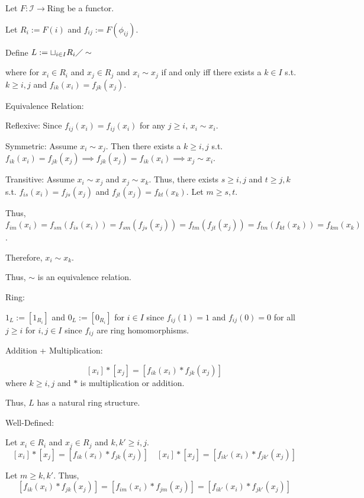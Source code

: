 \documentclass[12pt, letterpaper]{article}
\begin{document}
\qh
\begin{subproblem}{}
    
\end{subproblem}
\begin{problemproof}
    Let $F : \mathcal{I} \to \mathrm{Ring}$ be a functor.

    Let $R_i := F(i)$ and $f_{ij} := F(\phi_{ij})$.
    
    Define $L := \sqcup_{i \in I} R_i \diagup \sim$

    where for $x_i \in R_i$ and $x_j \in R_j$ and $x_i \sim x_j$ if and only iff there exists a $k \in I$ s.t. $k \geq i,j$ and $f_{ik}(x_i)=f_{jk}(x_j)$.

    Equivalence Relation:

    Reflexive: Since $f_{ij}(x_i)=f_{ij}(x_i)$ for any $j \geq i$, $x_i \sim x_i$.

    Symmetric: Assume $x_i \sim x_j$. Then there exists a $k \geq i,j$ s.t. $f_{ik}(x_i)=f_{jk}(x_j) \implies f_{jk}(x_j)=f_{ik}(x_i) \implies x_j \sim x_i$.

    Transitive: Assume $x_i \sim x_j$ and $x_j \sim x_k$. Thus, there exists $s \geq i,j$ and $t \geq j,k$ s.t. $f_{is}(x_i)=f_{js}(x_j)$ and $f_{jt}(x_j)=f_{kt}(x_k)$. Let $m \geq s,t$.

    Thus, $f_{im}(x_i)=f_{sm}(f_{is}(x_i))=f_{sm}(f_{js}(x_j))=f_{tm}(f_{jt}(x_j))=f_{tm}(f_{kt}(x_k))=f_{km}(x_k)$.

    Therefore, $x_i \sim x_k$.

    Thus, $\sim$ is an equivalence relation.

    Ring:

    $1_L := [1_{R_i}]$ and $0_L := [0_{R_i}]$ for $i \in I$ since $f_{ij}(1)=1$ and $f_{ij}(0)=0$ for all $j \geq i$ for $i,j \in I$ since $f_{ij}$ are ring homomorphisms.

    Addition + Multiplication:

    \[[x_i]*[x_j]=[f_{ik}(x_i)*f_{jk}(x_j)]\] where $k \geq i,j$ and $*$ is multiplication or addition.

    Thus, $L$ has a natural ring structure.

    Well-Defined:

    Let $x_i \in R_i$ and $x_j \in R_j$ and $k,k' \geq i,j$.
    \[[x_i]*[x_j]=[f_{ik}(x_i)*f_{jk}(x_j)] \quad [x_i]*[x_j]=[f_{ik'}(x_i)*f_{jk'}(x_j)]\]

    Let $m \geq k,k'$. Thus,
    \[[f_{ik}(x_i)*f_{jk}(x_j)] = [f_{im}(x_i) * f_{jm}(x_j)] =[f_{ik'}(x_i)*f_{jk'}(x_j)]\]


\end{problemproof}
\end{document}
